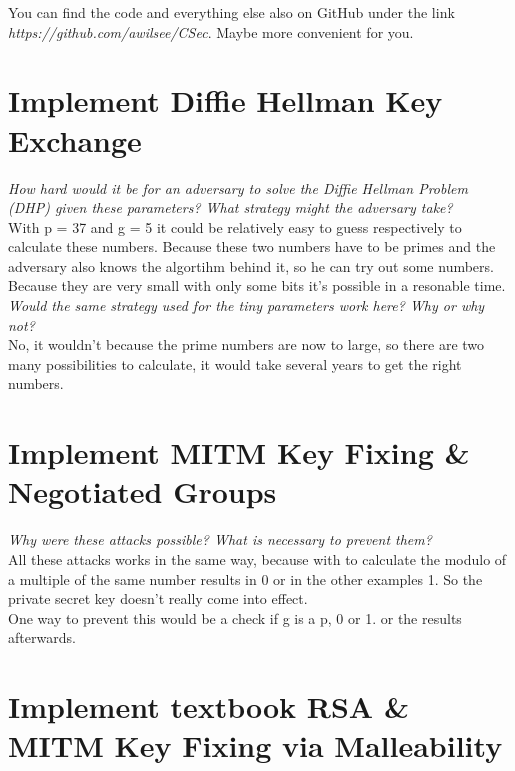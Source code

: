 You can find the code and everything else also on GitHub under the link \textit{https://github.com/awilsee/CSec}. Maybe more convenient for you.


\section{Implement Diffie Hellman Key Exchange}


\textit{How hard would it be for an adversary to solve the Diffie Hellman Problem (DHP) given these parameters? What strategy might the adversary take?}\\
With p = 37 and g = 5 it could be relatively easy to guess respectively to calculate these numbers. Because these two numbers have to be primes and the adversary also knows the algortihm behind it, so  he can try out some numbers. Because they are very small with only some bits it's possible in a resonable time.\\

\textit{Would the same strategy used for the tiny parameters work here? Why or why not?}\\
No, it wouldn't because the prime numbers are now to large, so there are two many possibilities to calculate, it would take several years to get the right numbers.\\

\section{Implement MITM Key Fixing \& Negotiated Groups}


\textit{Why were these attacks possible? What is necessary to prevent them?}\\
All these attacks works in the same way, because with to calculate the modulo of a multiple of the same number results in 0 or in the other examples 1. So the private secret key doesn't really come into effect. \\
One way to prevent this would be a check if g is a p, 0 or 1. or the results afterwards.\\


\section{Implement textbook RSA \& MITM Key Fixing via Malleability}


